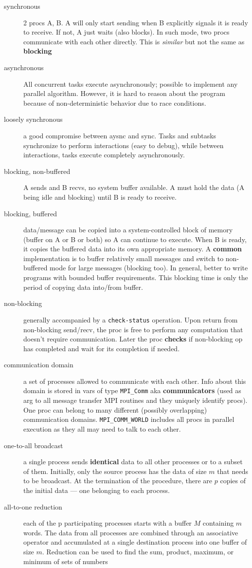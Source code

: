 \begin{description}
\item[synchronous] 2 procs A, B. A will only start sending when B explicitly signals it is ready to receive.  If not, A just waits (also blocks).  In such mode, two procs communicate with each other directly.  This is \emph{similar} but not the same as \textbf{blocking}
\item[asynchronous] All concurrent tasks execute asynchronously; possible to implement any parallel algorithm.  However, it is hard to reason about the program because of non-deterministic behavior due to race conditions.
\item[loosely synchronous] a good compromise between aysnc and sync.  Tasks and subtasks synchronize to perform interactions (easy to debug), while between interactions, tasks execute completely asynchronously.
\item[blocking, non-buffered] A sends and B recvs, no system buffer available.  A must hold the data (A being idle and blocking) until B is ready to receive.
\item[blocking, buffered] data/message can be copied into a system-controlled block of memory (buffer on A or B or both) so A can continue to execute.  When B is ready, it copies the buffered data into its own appropriate memory.  A \textbf{common} implementation is to buffer relatively small messages and switch to non-buffered mode for large messages (blocking too).  In general, better to write programs with bounded buffer requirements.  This blocking time is only the period of copying data into/from buffer.
\item[non-blocking] generally accompanied by a \texttt{check-status} operation.  Upon return from non-blocking send/recv, the proc is free to perform any computation that doesn't require communication.  Later the proc \textbf{checks} if non-blocking op has completed and wait for its completion if needed.
\item[communication domain] a set of processes allowed to communicate with each other.  Info about this domain is stored in vars of type \texttt{MPI\_Comm} aka \textbf{communicators} (used as arg to all message transfer MPI routines and they uniquely identify procs). One proc can belong to many different (possibly overlapping) communication domains.  \texttt{MPI\_COMM\_WORLD} includes all procs in parallel execution as they all may need to talk to each other.

\item[one-to-all broadcast] a single process sends \textbf{identical} data to all other processes or to a subset of them.  Initially, only the source process has the data of size $m$ that needs to be broadcast.  At the termination of the procedure, there are $p$ copies of the initial data --- one belonging to each process.

\item[all-to-one reduction] each of the p participating processes starts with a buffer $M$ containing $m$ words.  The data from all processes are combined through an associative operator and accumulated at a single destination process into one buffer of size $m$.  Reduction can be used to find the sum, product, maximum, or minimum of sets of numbers
\end{description}
